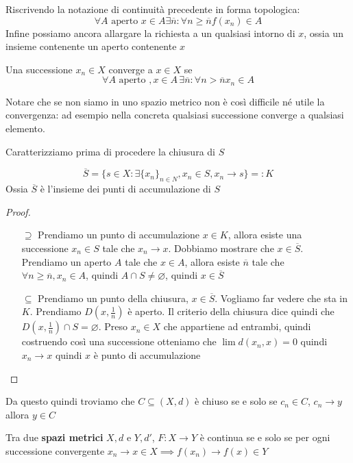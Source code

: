 Riscrivendo la notazione di continuità precedente in forma topologica:
\[
    \forall A \text{ aperto } x \in  A \exists \overline{n} : \forall n \ge
    \overline{n} f(x_{n}) \in A
\]
Infine possiamo ancora allargare la richiesta a un qualsiasi intorno di \(x\),
ossia un insieme contenente un aperto contenente \(x\) 

\begin{definition}
    Una successione \(x_{n} \in X\) converge a \(x \in  X\)  se
    \[
        \forall  A \text{ aperto }, x \in A\, \exists \overline{n} : \forall n >
        \overline{n} x_{n} \in A
    \]
\end{definition}
Notare che se non siamo in uno spazio metrico non è così difficile né utile la
convergenza: ad esempio nella concreta qualsiasi successione converge a
qualsiasi elemento.

Caratterizziamo prima di procedere la chiusura di \(S\) 
\begin{proposition}
\[\overline{S} = \{s \in  X : \exists \{x_{n}\}_{n \in  N}, x_{n} \in S, x_{n}
\to  s \} =: K\]
Ossia \(\overline{S}\) è l'insieme dei punti di accumulazione di \(S\) 
\end{proposition}

\begin{proof}\( \) 
\begin{itemize}[label = --]
    \item[\(\supseteq\) ] Prendiamo un punto di accumulazione \(x \in K\), allora
        esiste una successione \(x_{n} \in S\) tale che \(x_{n} \to  x\). Dobbiamo
        mostrare che \(x \in \overline{S}\). Prendiamo un aperto \(A\) tale che
        \(x \in A\), allora esiste \(\overline{n}\) tale che \(\forall n \ge
        \overline{n}, x_{n} \in A\), quindi \(A \cap  S \neq \varnothing\), quindi
        \(x \in \overline{S}\)
    \item[\(\subseteq \) ] Prendiamo un punto della chiusura, \(x \in  \overline{S}\). Vogliamo
        far vedere che sta in \(K\). Prendiamo \(D(x, \frac{1}{n})\) è aperto.
        Il criterio della chiusura dice quindi che \(D(x, \frac{1}{n}) \cap  S =
        \varnothing\). Preso \(x_{n} \in X \) che appartiene ad entrambi, quindi
        costruendo così una successione otteniamo che \(\lim d(x_{n}, x) = 0\)
        quindi \(x_{n} \to x\) quindi \(x\) è punto di accumulazione
\end{itemize}
\end{proof}
Da questo quindi troviamo che \(C \subseteq  (X, d)\) è chiuso se e solo se
\(c_n \in C\), \(c_n \to y\) allora \(y \in C\) 
\begin{theorem}
    Tra due \textbf{spazi metrici} \(X, d\) e \(Y, d'\), \(F : X \to  Y\) è
    continua se e solo se per ogni successione convergente \(x_{n} \to x \in X
    \implies f(x_{n}) \to f(x) \in Y\) 
\end{theorem}

